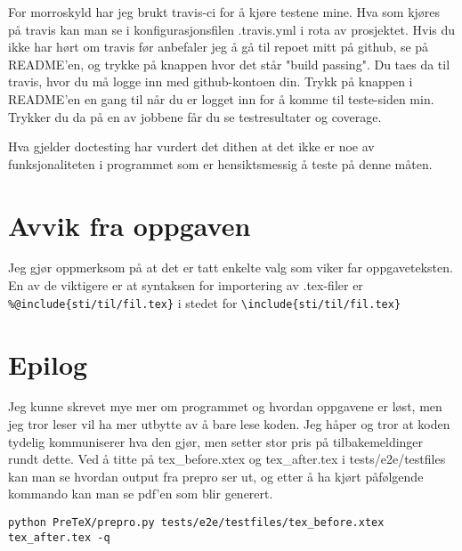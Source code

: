 \documentclass{article}
\newcommand{\code}[1]{\colorbox{codegray}{\texttt{#1}}}
\newcommand{\bs}[1]{{\texttt{\textbackslash #1}}}
\begin{document}
For morroskyld har jeg brukt travis-ci for å kjøre testene mine. Hva som kjøres
på travis kan man se i konfigurasjonsfilen .travis.yml i rota av prosjektet.
Hvis du ikke har hørt om travis før anbefaler jeg å gå til repoet mitt på github,
se på README'en, og trykke på knappen hvor det står "build passing". Du taes
da til travis, hvor du må logge inn med github-kontoen din. Trykk på knappen i README'en
en gang til når du er logget inn for å komme til teste-siden min. Trykker du da på
en av jobbene får du se testresultater og coverage.

Hva gjelder doctesting har vurdert det dithen at det ikke er noe av funksjonaliteten
i programmet som er hensiktsmessig å teste på denne måten.


\section{Avvik fra oppgaven}
Jeg gjør oppmerksom på at det er tatt enkelte valg som viker far oppgaveteksten.
En av de viktigere er at syntaksen for importering av .tex-filer er
\code{\%@include\{sti/til/fil.tex\}} i stedet for \code{\bs include\{sti/til/fil.tex\}}


\section{Epilog}
Jeg kunne skrevet mye mer om programmet og hvordan oppgavene er løst, men
jeg tror leser vil ha mer utbytte av å bare lese koden. Jeg håper og tror
at koden tydelig kommuniserer hva den gjør, men setter stor pris på tilbakemeldinger
rundt dette.
Ved å titte på tex\_before.xtex og tex\_after.tex i tests/e2e/testfiles kan man
se hvordan output fra prepro ser ut, og etter å ha kjørt påfølgende kommando
kan man se pdf'en som blir generert.

\begin{Verbatim}[numbers=none,frame=lines,label=\fbox{{\tiny Terminal}},fontsize=\fontsize{9pt}{9pt},
labelposition=topline,framesep=2.5mm,framerule=0.7pt]
python PreTeX/prepro.py tests/e2e/testfiles/tex_before.xtex tex_after.tex -q
\end{Verbatim}
\noindent
\end{document}
